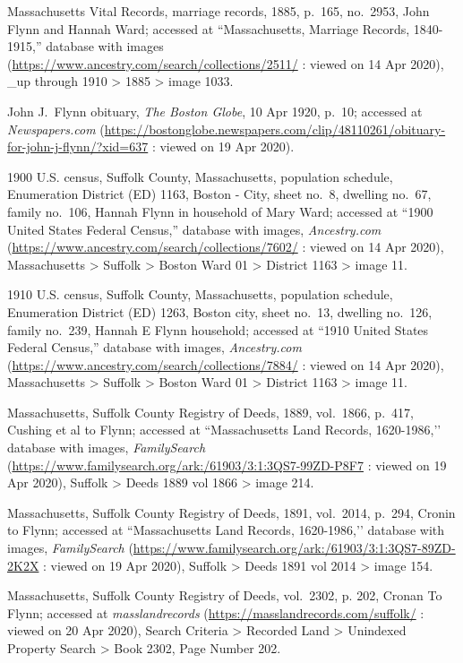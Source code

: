 \begin{thebibliography}{999}
	Massachusetts Vital Records, marriage records, 1885, p.\ 165, no.\ 2953, John Flynn and Hannah Ward; accessed at ``Massachusetts, Marriage Records, 1840-1915,'' database with images (\url{https://www.ancestry.com/search/collections/2511/} : viewed on 14 Apr 2020), \_up through 1910 > 1885 > image 1033.
		
	John J.\ Flynn obituary, \textit{The Boston Globe}, 10 Apr 1920, p.\ 10; accessed at \textit{Newspapers.com} (\url{https://bostonglobe.newspapers.com/clip/48110261/obituary-for-john-j-flynn/?xid=637} : viewed on 19 Apr 2020).
	
	1900 U.S. census, Suffolk County, Massachusetts, population schedule, Enumeration District (ED) 1163, Boston - City, sheet no.\ 8, dwelling no.\ 67, family no.\ 106, Hannah Flynn in household of Mary Ward; accessed at ``1900 United States Federal Census,'' database with images, \textit{Ancestry.com} (\url{https://www.ancestry.com/search/collections/7602/} : viewed on 14 Apr 2020), Massachusetts > Suffolk > Boston Ward 01 > District 1163 > image 11.	
	
	1910 U.S. census, Suffolk County, Massachusetts, population schedule, Enumeration District (ED) 1263, Boston city, sheet no.\ 13, dwelling no.\ 126, family no.\ 239, Hannah E Flynn household; accessed at ``1910 United States Federal Census,'' database with images, \textit{Ancestry.com} (\url{https://www.ancestry.com/search/collections/7884/} : viewed on 14 Apr 2020), Massachusetts > Suffolk > Boston Ward 01 > District 1163 > image 11.
	
	Massachusetts, Suffolk County Registry of Deeds, 1889, vol.\ 1866, p.\ 417, Cushing et al to Flynn; accessed at ``Massachusetts Land Records, 1620-1986,’’ database with images, \textit{FamilySearch} (\url{https://www.familysearch.org/ark:/61903/3:1:3QS7-99ZD-P8F7} : viewed on 19 Apr 2020), Suffolk > Deeds 1889 vol 1866 > image 214.
	
	Massachusetts, Suffolk County Registry of Deeds, 1891, vol.\ 2014, p.\ 294, Cronin to Flynn; accessed at ``Massachusetts Land Records, 1620-1986,’’ database with images, \textit{FamilySearch} (\url{https://www.familysearch.org/ark:/61903/3:1:3QS7-89ZD-2K2X} : viewed on 19 Apr 2020), Suffolk > Deeds 1891 vol 2014 > image 154.
	
	Massachusetts, Suffolk County Registry of Deeds, vol.\ 2302, p. 202, Cronan To Flynn; accessed at \textit{masslandrecords} (\url{https://masslandrecords.com/suffolk/} : viewed on 20 Apr 2020), Search Criteria > Recorded Land > Unindexed Property Search > Book 2302, Page Number 202.
	

\end{thebibliography}
